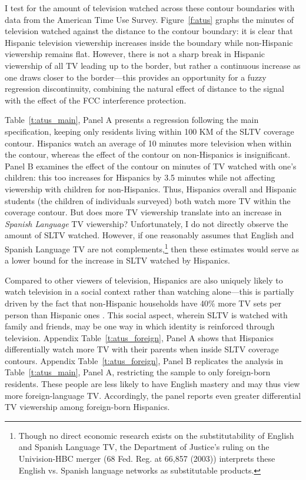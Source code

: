 \documentclass[11pt]{article}
\begin{document}
I test for the amount of television watched across these contour boundaries with data from the American Time Use Survey. Figure~\ref{f:atus} graphs the minutes of television watched against the distance to the contour boundary: it is clear that Hispanic television viewership increases inside the boundary while non-Hispanic viewership remains flat. However, there is not a sharp break in Hispanic viewership of all TV leading up to the border, but rather a continuous increase as one draws closer to the border---this provides an opportunity for a fuzzy regression discontinuity, combining the natural effect of distance to the signal with the effect of the FCC interference protection. 

Table~\ref{t:atus_main}, Panel A presents a regression following the main specification, keeping only residents living within 100 KM of the SLTV coverage contour. Hispanics watch an average of 10 minutes more television when within the contour, whereas the effect of the contour on non-Hispanics is insignificant. Panel B examines the effect of the contour on minutes of TV watched with one's children: this too increases for Hispanics by 3.5 minutes while not affecting viewership with children for non-Hispanics. Thus, Hispanics overall and Hispanic students (the children of individuals surveyed) both watch more TV within the coverage contour. But does more TV viewership translate into an increase in \textit{Spanish Language} TV viewership? Unfortunately, I do not directly observe the amount of SLTV watched. However, if one reasonably assumes that English and Spanish Language TV are not complements,\footnote{ Though no direct economic research exists on the substitutability of English and Spanish Language TV, the Department of Justice's ruling on the Univision-HBC merger (68 Fed. Reg. at 66,857 (2003)) interprets these English vs. Spanish language networks as substitutable products.} then these estimates would serve as a lower bound for the increase in SLTV watched by Hispanics. 


Compared to other viewers of television, Hispanics are also uniquely likely to watch television in a social context rather than watching alone---this is partially driven by the fact that non-Hispanic households have 40\% more TV sets per person than Hispanic ones \citep{coghill_tuning_2018}. This social aspect, wherein SLTV is watched with family and friends, may be one way in which identity is reinforced through television. Appendix Table~\ref{t:atus_foreign}, Panel A shows that Hispanics differentially watch more TV with their parents when inside SLTV coverage contours. Appendix Table~\ref{t:atus_foreign}, Panel B replicates the analysis in Table~\ref{t:atus_main}, Panel A, restricting the sample to only foreign-born residents. These people are less likely to have English mastery and may thus view more foreign-language TV. Accordingly, the panel reports even greater differential TV viewership among foreign-born Hispanics.
\end{document}

